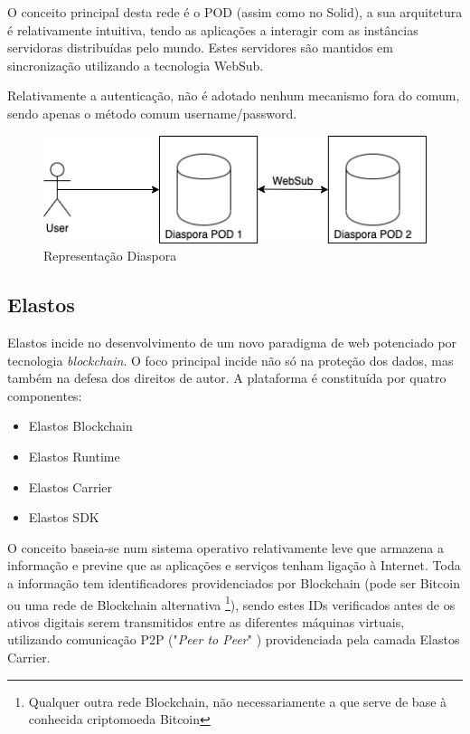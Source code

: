 O conceito principal desta rede é o POD \label{sym:POD} (assim como no Solid), a sua arquitetura é relativamente intuitiva, tendo as aplicações a interagir com as instâncias servidoras distribuídas pelo mundo. Estes servidores são mantidos em sincronização utilizando a tecnologia WebSub. \cite{diaspora_wiki}

Relativamente a autenticação, não é adotado nenhum mecanismo fora do comum, sendo apenas o método comum username/password.

\begin{figure}[h]
    \begin{center}
    \includegraphics[width=1\textwidth]{figures/estado_arte-Diaspora.png}
    \caption{Representação Diaspora}
    \end{center}
\end{figure}

\subsection{Elastos}
Elastos incide no desenvolvimento de um novo paradigma de web potenciado por tecnologia \emph{blockchain}\cite{a_bit_about_blockchain}. O foco principal incide não só na proteção dos dados, mas também na defesa dos direitos de autor. A plataforma é constituída por quatro componentes:\cite{elastos_white_paper}
\begin{itemize}
	\item Elastos Blockchain
	\item Elastos Runtime
	\item Elastos Carrier
	\item Elastos SDK
\end{itemize}

O conceito baseia-se num sistema operativo relativamente leve que armazena a informação e previne que as aplicações e serviços tenham ligação à Internet. Toda a informação tem identificadores providenciados por Blockchain (pode ser Bitcoin ou uma rede de Blockchain alternativa \footnote{Qualquer outra rede Blockchain, não necessariamente a que serve de base à conhecida criptomoeda Bitcoin}), sendo estes IDs verificados antes de os ativos digitais serem transmitidos entre as diferentes máquinas virtuais, utilizando comunicação P2P ("\emph{Peer to Peer}" \label{sym:P2P})\cite{what_are_P2P_networks} providenciada pela camada Elastos Carrier.\cite{elastos_developer}

